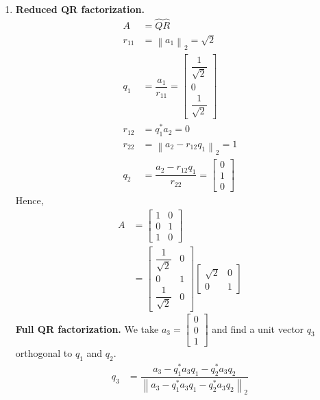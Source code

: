 \documentclass[a4paper,oneside]{book}
\numberwithin{equation}{chapter}
\begin{document}
\begin{enumerate}
\item \textbf{\textsf{Reduced QR factorization.}}
\begin{align}
A &= \hat Q\hat R\\
{r_{11}} &= {\left\| {{a_1}} \right\|_2} = \sqrt 2 \\
{q_1} &= \dfrac{{{a_1}}}{{{r_{11}}}} = \left[ {\begin{array}{*{20}{c}}
{\dfrac{1}{{\sqrt 2 }}}\\
0\\
{\dfrac{1}{{\sqrt 2 }}}
\end{array}} \right]\\
{r_{12}} &= q_1^*{a_2} = 0\\
{r_{22}} &= {\left\| {{a_2} - {r_{12}}{q_1}} \right\|_2} = 1\\
{q_2} &= \dfrac{{{a_2} - {r_{12}}{q_1}}}{{{r_{22}}}} = \left[ {\begin{array}{*{20}{c}}
0\\
1\\
0
\end{array}} \right]
\end{align}
Hence, 
\begin{align}
A &= \left[ {\begin{array}{*{20}{c}}
1&0\\
0&1\\
1&0
\end{array}} \right]\\
 &= \left[ {\begin{array}{*{20}{c}}
{\dfrac{1}{{\sqrt 2 }}}&0\\
0&1\\
{\dfrac{1}{{\sqrt 2 }}}&0
\end{array}} \right]\left[ {\begin{array}{*{20}{c}}
{\sqrt 2 }&0\\
0&1
\end{array}} \right]
\end{align}
\textbf{\textsf{Full QR factorization.}} 
We take ${a_3} = \left[ {\begin{array}{*{20}{c}}
0\\
0\\
1
\end{array}} \right]$ and find a unit vector $q_3$ orthogonal to $q_1$ and $q_2$.
\begin{align}
{q_3} &= \dfrac{{{a_3} - q_1^*{a_3}{q_1} - q_2^*{a_3}{q_2}}}{{{{\left\| {{a_3} - q_1^*{a_3}{q_1} - q_2^*{a_3}{q_2}} \right\|}_2}}}\\

\end{align}
\end{enumerate}
\end{document}
